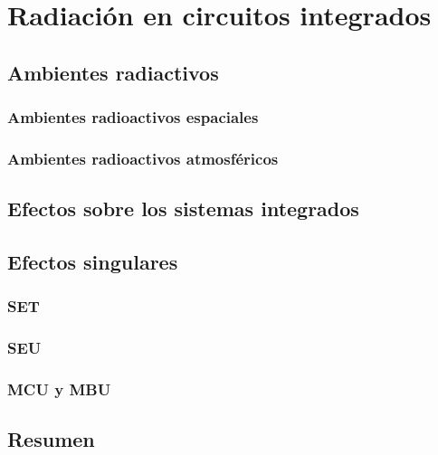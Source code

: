 \chapter{Radiación en circuitos integrados}
    

    \section{Ambientes radiactivos}
    
        \subsection{Ambientes radioactivos espaciales}
        
        \subsection{Ambientes radioactivos atmosféricos}
        

\section{Efectos sobre los sistemas integrados}


\section{Efectos singulares}


    \subsection{SET}
    
    \subsection{SEU}
    
    \subsection{MCU y MBU}
    

\section{Resumen}
